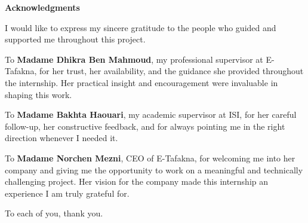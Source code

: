 
\clearpage
\thispagestyle{empty}

\begin{center}
  {\LARGE \textbf{Acknowledgments}}
\end{center}

\vspace{1.5cm}


I would like to express my sincere gratitude to the people who guided and supported me throughout this project.

\vspace{0.8cm}

To \textbf{Madame Dhikra Ben Mahmoud}, my professional supervisor at E-Tafakna, for her trust, her availability, and the guidance she provided throughout the internship. Her practical insight and encouragement were invaluable in shaping this work.

\vspace{0.8cm}

To \textbf{Madame Bakhta Haouari}, my academic supervisor at ISI, for her careful follow-up, her constructive feedback, and for always pointing me in the right direction whenever I needed it.

\vspace{0.8cm}

To \textbf{Madame Norchen Mezni}, CEO of E-Tafakna, for welcoming me into her company and giving me the opportunity to work on a meaningful and technically challenging project. Her vision for the company made this internship an experience I am truly grateful for.

\vspace{0.8cm}

To each of you, thank you.

\clearpage
